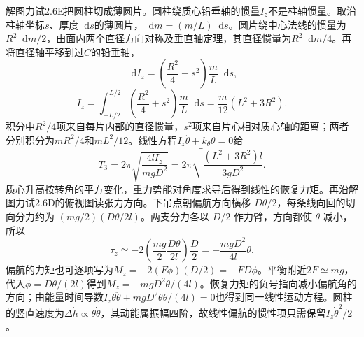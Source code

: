 \documentclass[UTF8,fontset=fandol,a4paper,11pt]{ctexart}
\newcommand{\dd}{\mathop{}\!\mathrm{d}}
\begin{document}
解图力试2.6E把圆柱切成薄圆片。圆柱绕质心铅垂轴的惯量$I_z$不是柱轴惯量。取沿柱轴坐标$s$、厚度$\dd s$的薄圆片，$\dd m=(m/L)\dd s$。圆片绕中心法线的惯量为$R^2\dd m/2$，由面内两个直径方向对称及垂直轴定理，其直径惯量为$R^2\dd m/4$。再将直径轴平移到过$C$的铅垂轴，
\[
\dd I_z=\left(\frac{R^2}{4}+s^2\right)\frac mL\dd s,
\]
\[
I_z=\int_{-L/2}^{L/2}
\left(\frac{R^2}{4}+s^2\right)\frac mL\dd s
=\frac m{12}(L^2+3R^2).
\]
积分中$R^2/4$项来自每片内部的直径惯量，$s^2$项来自片心相对质心轴的距离；两者分别积分为$mR^2/4$和$mL^2/12$。线性方程$I_z\ddot\theta+k_\theta\theta=0$给
\[
\boxed{T_3=2\pi\sqrt{\frac{4lI_z}{mgD^2}}
=2\pi\sqrt{\frac{(L^2+3R^2)l}{3gD^2}}}.
\]
质心升高按转角的平方变化，重力势能对角度求导后得到线性的恢复力矩。再沿解图力试2.6D的俯视图读张力方向。下吊点朝偏航方向横移 $D\theta/2$，每条线向回的切向分力约为 $(mg/2)(D\theta/2l)$。两支分力各以 $D/2$ 作力臂，方向都使 $\theta$ 减小，所以
\[
\tau_z \simeq -2\left(\frac{mg}{2}\frac{D\theta}{2l}\right)\frac D2
=-\frac{mgD^2}{4l}\theta.
\]
偏航的力矩也可逐项写为$M_z=-2(F\phi)(D/2)=-FD\phi$。平衡附近$2F\simeq mg$，代入$\phi=D\theta/(2l)$得到$M_z=-mgD^2\theta/(4l)$。恢复力矩的负号指向减小偏航角的方向；由能量时间导数$I_z\dot\theta\ddot\theta+mgD^2\theta\dot\theta/(4l)=0$也得到同一线性运动方程。圆柱的竖直速度为$\Delta\dot h\propto\theta\dot\theta$，其动能属振幅四阶，故线性偏航的惯性项只需保留$I_z\dot\theta^2/2$。
\end{document}
